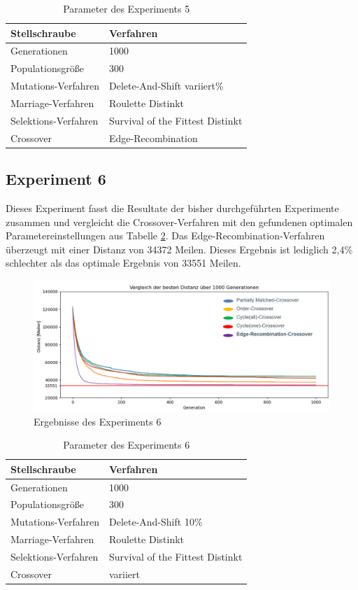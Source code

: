 \begin{table}[H]
\centering
\caption{Parameter des Experiments 5}
\begin{tabular}{ll}
Stellschraube & Verfahren \\
\hline
Generationen & 1000 \\
Populationsgröße & 300 \\
Mutations-Verfahren & Delete-And-Shift variiert\% \\
Marriage-Verfahren & Roulette Distinkt \\
Selektions-Verfahren & Survival of the Fittest Distinkt \\
Crossover & Edge-Recombination
\end{tabular}
\label{tab:e5}
\end{table}

\subsection{Experiment 6}
Dieses Experiment fasst die Resultate der bisher durchgeführten Experimente zusammen und vergleicht die Crossover-Verfahren mit den gefundenen optimalen Parametereinstellungen aus Tabelle \ref{tab:e6}.
Das Edge-Recombination-Verfahren überzeugt mit einer Distanz von 34372 Meilen. Dieses Ergebnis ist lediglich 2,4\% schlechter als das optimale Ergebnis von 33551 Meilen. 
\begin{figure}[H]
\centering
\includegraphics[width=1\textwidth]{img/Vortrag/experiment6.png}
\caption{Ergebnisse des Experiments 6}
\label{fig:experiment6}
\end{figure}

\begin{table}[H]
\centering
\caption{Parameter des Experiments 6}
\begin{tabular}{ll}
Stellschraube & Verfahren \\
\hline
Generationen & 1000 \\
Populationsgröße & 300 \\
Mutations-Verfahren & Delete-And-Shift 10\% \\
Marriage-Verfahren & Roulette Distinkt \\
Selektions-Verfahren & Survival of the Fittest Distinkt \\
Crossover & variiert
\end{tabular}
\label{tab:e6}
\end{table}

